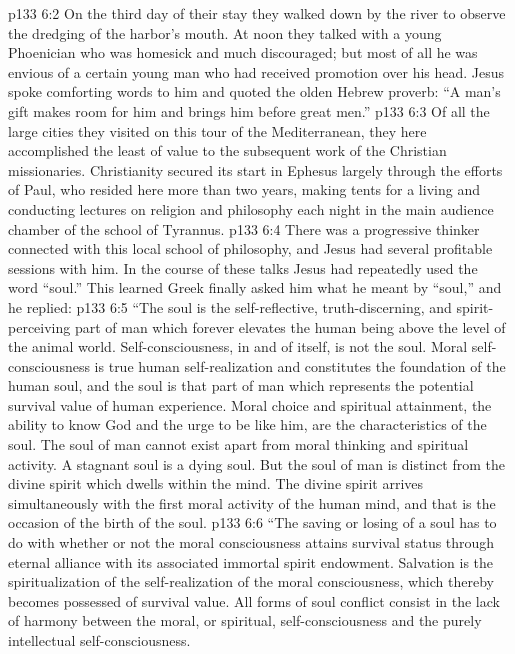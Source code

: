 \vs p133 6:2 On the third day of their stay they walked down by the river to observe the dredging of the harbor’s mouth. At noon they talked with a young Phoenician who was homesick and much discouraged; but most of all he was envious of a certain young man who had received promotion over his head. Jesus spoke comforting words to him and quoted the olden Hebrew proverb: \textcolor{ubdarkred}{“A man’s gift makes room for him and brings him before great men.”}
\vs p133 6:3 Of all the large cities they visited on this tour of the Mediterranean, they here accomplished the least of value to the subsequent work of the Christian missionaries. Christianity secured its start in Ephesus largely through the efforts of Paul, who resided here more than two years, making tents for a living and conducting lectures on religion and philosophy each night in the main audience chamber of the school of Tyrannus.
\vs p133 6:4 There was a progressive thinker connected with this local school of philosophy, and Jesus had several profitable sessions with him. In the course of these talks Jesus had repeatedly used the word “soul.” This learned Greek finally asked him what he meant by “soul,” and he replied:
\vs p133 6:5 \pc \textcolor{ubdarkred}{“The soul is the self\hyp{}reflective, truth\hyp{}discerning, and spirit\hyp{}perceiving part of man which forever elevates the human being above the level of the animal world. Self\hyp{}consciousness, in and of itself, is not the soul. Moral self\hyp{}consciousness is true human self\hyp{}realization and constitutes the foundation of the human soul, and the soul is that part of man which represents the potential survival value of human experience. Moral choice and spiritual attainment, the ability to know God and the urge to be like him, are the characteristics of the soul. The soul of man cannot exist apart from moral thinking and spiritual activity. A stagnant soul is a dying soul. But the soul of man is distinct from the divine spirit which dwells within the mind. The divine spirit arrives simultaneously with the first moral activity of the human mind, and that is the occasion of the birth of the soul.}
\vs p133 6:6 \textcolor{ubdarkred}{“The saving or losing of a soul has to do with whether or not the moral consciousness attains survival status through eternal alliance with its associated immortal spirit endowment. Salvation is the spiritualization of the self\hyp{}realization of the moral consciousness, which thereby becomes possessed of survival value. All forms of soul conflict consist in the lack of harmony between the moral, or spiritual, self\hyp{}consciousness and the purely intellectual self\hyp{}consciousness.}
